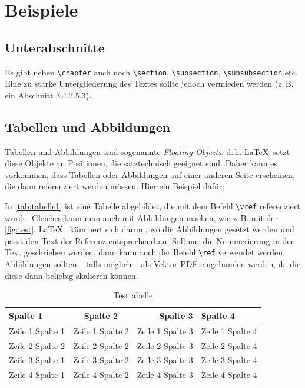 \section{Beispiele}

\subsection{Unterabschnitte}
Es gibt neben \texttt{\textbackslash chapter} auch noch  \texttt{\textbackslash section}, \texttt{\textbackslash subsection}, \texttt{\textbackslash subsubsection} etc. Eine zu starke Untergliederung des Textes sollte jedoch vermieden werden (z.\,B. ein Abschnitt 3.4.2.5.3). 

\subsection{Tabellen und Abbildungen}
Tabellen und Abbildungen sind sogenannte \textit{Floating Objects}, d.\,h. \LaTeX\ setzt diese Objekte an Positionen, die satztechnisch geeignet sind. Daher kann es vorkommen, dass Tabellen oder Abbildungen auf einer anderen Seite erscheinen, die dann referenziert werden müssen. Hier ein Beispiel dafür: 

In \autoref{tab:tabelle1} ist eine Tabelle abgebildet, die mit dem Befehl \texttt{\textbackslash vref} referenziert wurde. Gleiches kann man auch mit Abbildungen 
machen, wie z.\,B. mit der \autoref{fig:test}. \LaTeX~ kümmert sich darum, wo die Abbildungen gesetzt werden und passt den Text der Referenz entsprechend an. Soll nur die Nummerierung in den Text geschrieben werden, dann kann auch der Befehl \texttt{\textbackslash ref} verwendet werden.
Abbildungen sollten -- falls möglich -- als Vektor-PDF eingebunden 
werden, da die diese dann beliebig skalieren können.


\begin{table}[h!]
	\centering
	\begin{tabular}{p{3cm}crl}
		\textbf{Spalte 1} & \textbf{Spalte 2} & \textbf{Spalte 3} & \textbf{Spalte 4}\\\toprule
		Zeile 1 Spalte 1 &  Zeile 1 Spalte 2 & Zeile 1 Spalte 3 & Zeile 1 Spalte 4\\
		Zeile 2 Spalte 2 &  Zeile 2 Spalte 2 & Zeile 2 Spalte 3 & Zeile 2 Spalte 4\\\midrule
		Zeile 3 Spalte 1 &  Zeile 3 Spalte 2 & Zeile 3 Spalte 3 & Zeile 3 Spalte 4\\
		Zeile 4 Spalte 1 &  Zeile 4 Spalte 2 & Zeile 4 Spalte 3 & Zeile 4 Spalte 4\\\bottomrule
	\end{tabular}
	\caption[Testtabelle]{\label{tab:tabelle1}Testtabelle}
\end{table}


